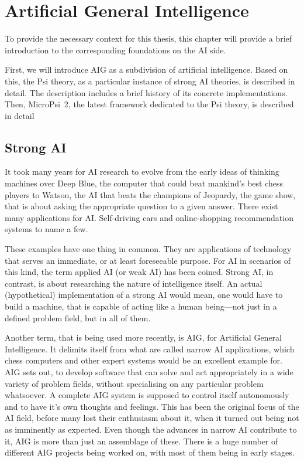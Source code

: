 \chapter{Artificial General Intelligence}
To provide the necessary context for this thesis, this chapter will provide a brief introduction to the corresponding foundations on the AI side.

First, we will introduce AIG as a subdivision of artificial intelligence. Based on this, the Psi theory, as a particular instance of strong AI theories, is described in detail. The description includes a brief history of its concrete implementations. Then, MicroPsi~2, the latest framework dedicated to the Psi theory, is described in detail 

    \section{Strong AI}
It took many years for AI research to evolve from the early ideas of thinking machines over Deep Blue, the computer that could beat mankind's best chess players to Watson, the AI that beats the champions of Jeopardy, the game show, that is about asking the appropriate question to a given answer. There exist many applications for AI. Self-driving cars and online-shopping recommendation systems to name a few.


These examples have one thing in common. They are applications of technology that serves an immediate, or at least foreseeable purpose. For AI in scenarios of this kind, the term applied AI (or weak AI) has been coined. Strong AI, in contrast, is about researching the nature of intelligence itself. An actual (hypothetical) implementation of a strong AI would mean, one would have to build a machine, that is capable of acting like a human being---not just in a defined problem field, but in all of them. 

Another term, that is being used more recently, is AIG, for Artificial General Intelligence. It delimits itself from what are called narrow AI applications, which chess computers and other expert systems would be an excellent example for. AIG sets out, to develop software that can solve and act appropriately in a wide variety of problem fields, without specialising on any particular problem whatsoever. A complete AIG system is supposed to control itself autonomously and to have it's own thoughts and feelings. This has been the original focus of the AI field, before many lost their enthusiasm about it, when it turned out being not as imminently as expected. Even though the advances in narrow AI contribute to it, AIG is more than just an assemblage of these. There is a huge number of different AIG projects being worked on, with most of them being in early stages.~\cite{goertzel2007artificial}

